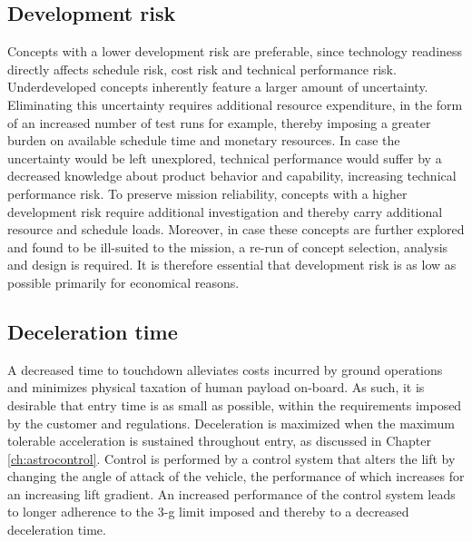\subsection{Development risk}
Concepts with a lower development risk are preferable, since technology readiness directly affects schedule risk, cost risk and technical performance risk. Underdeveloped concepts inherently feature a larger amount of uncertainty. Eliminating this uncertainty requires additional resource expenditure, in the form of an increased number of test runs for example, thereby imposing a greater burden on available schedule time and monetary resources. In case the uncertainty would be left unexplored, technical performance would suffer by a decreased knowledge about product behavior and capability, increasing technical performance risk. To preserve mission reliability, concepts with a higher development risk require additional investigation and thereby carry additional resource and schedule loads. Moreover, in case these concepts are further explored and found to be ill-suited to the mission, a re-run of concept selection, analysis and design is required. It is therefore essential that development risk is as low as possible primarily for economical reasons.

\subsection{Deceleration time}
A decreased time to touchdown alleviates costs incurred by ground operations and minimizes physical taxation of human payload on-board. As such, it is desirable that entry time is as small as possible, within the requirements imposed by the customer and regulations. Deceleration is maximized when the maximum tolerable acceleration is sustained throughout entry, as discussed in Chapter \ref{ch:astrocontrol}. Control is performed by a control system that alters the lift by changing the angle of attack of the vehicle, the performance of which increases for an increasing lift gradient. An increased performance of the control system leads to longer adherence to the 3-g limit imposed and thereby to a decreased deceleration time.

